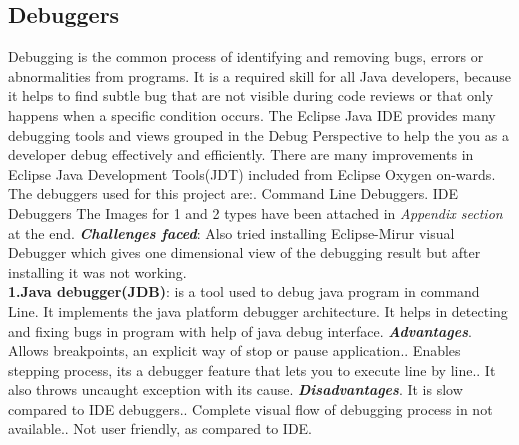 \documentclass[a4paper,12pt]{article}
\begin{document}
\begin{titlepage}
\subsection{Debuggers}
Debugging is the common process of identifying and removing bugs, errors or abnormalities from programs. It is a required skill for all Java developers, because it helps to find subtle bug that are not visible during code reviews or that only happens when a specific condition occurs. The Eclipse Java IDE provides many debugging tools and views grouped in the Debug Perspective to help the you as a developer debug effectively and efficiently.
There are many improvements in Eclipse Java Development Tools(JDT) included from Eclipse Oxygen on-wards. \newline
The debuggers used for this project are:. Command Line Debuggers. IDE Debuggers\newline
The Images for 1 and 2 types have been attached in \textit{Appendix section} at the end.\newline
\textbf{\textit{Challenges faced}}: Also tried installing Eclipse-Mirur visual Debugger which gives one dimensional view of the debugging result but after installing it was not working.\\ 
\newline
\textbf{1.Java debugger(JDB)}: is a tool used to debug java program in command Line. It implements the java platform debugger architecture. It helps in detecting and fixing bugs in program with help of java debug interface.\newline
\textbf{\textit{Advantages}}. Allows breakpoints, an explicit way of stop or pause application.. Enables stepping process, its a debugger feature that lets you to execute line by line.. It also throws uncaught exception with its cause.\newline
\textbf{\textit{Disadvantages}}. It is slow compared to IDE debuggers.. Complete visual flow of debugging process in not available.. Not user friendly, as compared to IDE.\newline
\newline
\newline

\end{titlepage}
\end{document}
